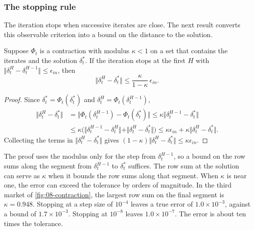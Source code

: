 \subsubsection{The stopping rule}
The iteration stops when successive iterates are close. The next result converts this observable criterion
into a bound on the distance to the solution.

\begin{proposition}\label{prop:08-innererror}
Suppose $\Phi_t$ is a contraction with modulus $\kappa < 1$ on a set that contains the iterates and the
solution $\delta^*_t$. If the iteration stops at the first $H$ with $\Vert \delta^H_t - \delta^{H-1}_t\Vert
\leq \epsilon_{in}$, then
\begin{equation*}
  \Vert \delta^H_t - \delta^*_t \Vert \leq \frac{\kappa}{1 - \kappa}\,\epsilon_{in}.
\end{equation*}
\end{proposition}

\begin{proof}
Since $\delta^*_t = \Phi_t(\delta^*_t)$ and $\delta^H_t = \Phi_t(\delta^{H-1}_t)$,
\begin{align*}
  \Vert \delta^H_t - \delta^*_t\Vert &= \Vert \Phi_t(\delta^{H-1}_t) - \Phi_t(\delta^*_t)\Vert
  \leq \kappa\Vert \delta^{H-1}_t - \delta^*_t\Vert \\
  &\leq \kappa\big(\Vert \delta^{H-1}_t - \delta^{H}_t\Vert + \Vert \delta^H_t - \delta^*_t\Vert\big)
  \leq \kappa\epsilon_{in} + \kappa\Vert \delta^H_t - \delta^*_t\Vert.
\end{align*}
Collecting the terms in $\Vert \delta^H_t - \delta^*_t\Vert$ gives $(1 - \kappa)\Vert \delta^H_t -
\delta^*_t\Vert \leq \kappa\epsilon_{in}$.
\end{proof}

The proof uses the modulus only for the step from $\delta^{H-1}_t$, so a bound on the row sums along the
segment from $\delta^{H-1}_t$ to $\delta^*_t$ suffices. The row sum at the solution can serve as $\kappa$ when it
bounds the row sums along that segment. When $\kappa$ is near one, the error can
exceed the tolerance by orders of magnitude. In the third market of \cref{fig:08-contraction}, the largest row sum
on the final segment is $\kappa = 0.948$. Stopping at a step size of $10^{-4}$ leaves a true error of
$1.0 \times 10^{-3}$, against a bound of $1.7 \times 10^{-3}$. Stopping at $10^{-8}$ leaves $1.0 \times
10^{-7}$. The error is about ten times the tolerance.

